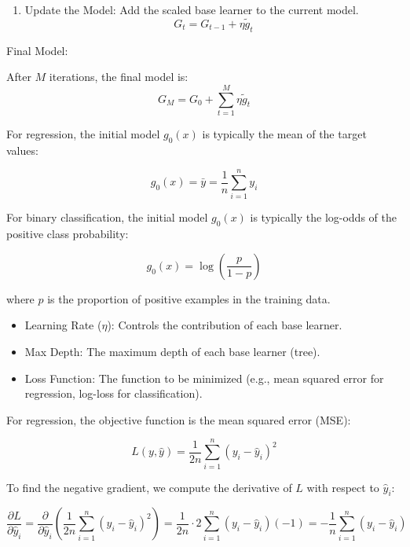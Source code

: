 \documentclass[12pt]{article}
\begin{document}
\begin{enumerate}
\begin{enumerate}
    \item Update the Model: Add the scaled base learner to the current model.
    \[
    G_t = G_{t-1} + \eta \tilde{g}_t
    \]
\end{enumerate}

Final Model:

After \(M\) iterations, the final model is:
\[
G_M = G_0 + \sum_{t=1}^{M} \eta \tilde{g}_t
\]


For regression, the initial model \( g_0(x) \) is typically the mean of the target values:

\[
g_0(x) = \bar{y} = \frac{1}{n} \sum_{i=1}^{n} y_i
\]


For binary classification, the initial model \( g_0(x) \) is typically the log-odds of the positive class probability:

\[
g_0(x) = \log \left( \frac{p}{1-p} \right)
\]

where \( p \) is the proportion of positive examples in the training data.


\begin{itemize}
    \item Learning Rate (\(\eta\)): Controls the contribution of each base learner.
    \item Max Depth: The maximum depth of each base learner (tree).
    \item Loss Function: The function to be minimized (e.g., mean squared error for regression, log-loss for classification).
\end{itemize}


For regression, the objective function is the mean squared error (MSE):

\[
L(y, \hat{y}) = \frac{1}{2n} \sum_{i=1}^{n} (y_i - \hat{y}_i)^2
\]

To find the negative gradient, we compute the derivative of \(L\) with respect to \(\hat{y}_i\):

\[
\frac{\partial L}{\partial \hat{y}_i} = \frac{\partial}{\partial \hat{y}_i} \left( \frac{1}{2n} \sum_{i=1}^{n} (y_i - \hat{y}_i)^2 \right) = \frac{1}{2n} \cdot 2 \sum_{i=1}^{n} (y_i - \hat{y}_i)(-1) = -\frac{1}{n} \sum_{i=1}^{n} (y_i - \hat{y}_i)
\]


\end{enumerate}
\end{document}
